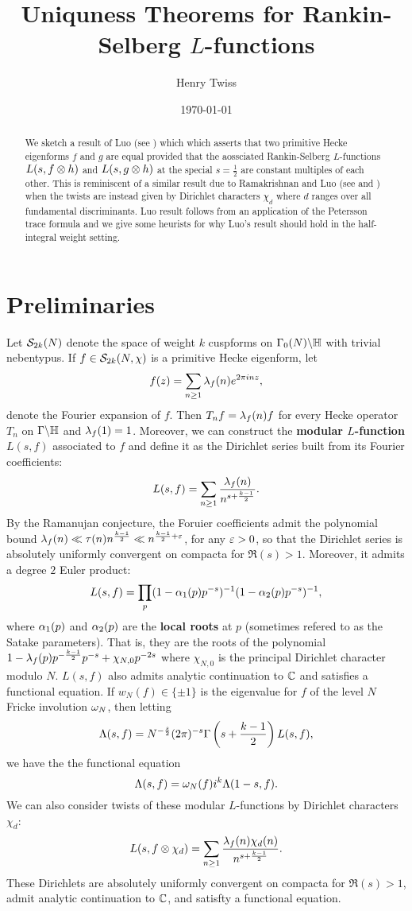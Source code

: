 \documentclass[12pt,reqno,oneside]{amsart}
\title{Uniquness Theorems for Rankin-Selberg \texorpdfstring{$L$}{L}-functions}
\author{Henry Twiss}
\date{\today}
\begin{document}
\begin{abstract}
    We sketch a result of Luo (see \cite{L}) which which asserts that two primitive Hecke eigenforms $f$ and $g$ are equal provided that the aossciated Rankin-Selberg $L$-functions $L(s,f \otimes h)$ and $L(s,g \otimes h)$ at the special $s = \frac{1}{2}$ are constant multiples of each other. This is reminiscent of a similar result due to Ramakrishnan and Luo (see \cite{LR-1} and \cite{LR-2}) when the twists are instead given by Dirichlet characters $\chi_{d}$ where $d$ ranges over all fundamental discriminants. Luo result follows from an application of the Petersson trace formula and we give some heurists for why Luo's result should hold in the half-integral weight setting.
\end{abstract}

\maketitle

\section{Preliminaries}
    Let $\mathcal{S}_{2k}(N)$ denote the space of weight $k$ cuspforms on $\Gamma_{0}(N)\backslash\mathbb{H}$ with trivial nebentypus. If $f \in \mathcal{S}_{2k}(N,\chi)$ is a primitive Hecke eigenform, let
    \[
        f(z) = \sum_{n \ge 1}\lambda_{f}(n)e^{2\pi inz},
    \]
    denote the Fourier expansion of $f$. Then $T_{n}f = \lambda_{f}(n)f$ for every Hecke operator $T_{n}$ on $\Gamma\backslash\mathbb{H}$ and $\lambda_{f}(1) = 1$. Moreover, we can construct the \textbf{modular $L$-function} $L(s,f)$ associated to $f$ and define it as the Dirichlet series built from its Fourier coefficients:
    \[
        L(s,f) = \sum_{n \ge 1}\frac{\lambda_{f}(n)}{n^{s+\frac{k-1}{2}}}.
    \]
    By the Ramanujan conjecture, the Foruier coefficients admit the polynomial bound $\lambda_{f}(n) \ll \tau(n)n^{\frac{k-1}{2}} \ll n^{\frac{k-1}{2}+\varepsilon}$, for any $\varepsilon > 0$, so that the Dirichlet series is absolutely uniformly convergent on compacta for $\Re(s) > 1$. Moreover, it admits a degree $2$ Euler product:
    \[
        L(s,f) = \prod_{p}(1-\alpha_{1}(p)p^{-s})^{-1}(1-\alpha_{2}(p)p^{-s})^{-1},
    \]
    where $\alpha_{1}(p)$ and $\alpha_{2}(p)$ are the \textbf{local roots} at $p$ (sometimes refered to as the Satake parameters). That is, they are the roots of the polynomial $1-\lambda_{f}(p)p^{-\frac{k-1}{2}}p^{-s}+\chi_{N,0}p^{-2s}$ where $\chi_{N,0}$ is the principal Dirichlet character modulo $N$. $L(s,f)$ also admits analytic continuation to $\mathbb{C}$ and satisfies a functional equation. If $w_{N}(f) \in \{\pm 1\}$ is the eigenvalue for $f$ of the level $N$ Fricke involution $\omega_{N}$, then letting
    \[
        \Lambda(s,f) = N^{-\frac{s}{2}}(2\pi)^{-s}\Gamma\left(s+\frac{k-1}{2}\right)L(s,f),
    \]
    we have the the functional equation
    \[
        \Lambda(s,f) = \omega_{N}(f)i^{k}\Lambda(1-s,f).
    \]
    We can also consider twists of these modular $L$-functions by Dirichlet characters $\chi_{d}$:
    \[
        L(s,f \otimes \chi_{d}) = \sum_{n \ge 1}\frac{\lambda_{f}(n)\chi_{d}(n)}{n^{s+\frac{k-1}{2}}}.
    \]
    These Dirichlets are absolutely uniformly convergent on compacta for $\Re(s) > 1$, admit analytic continuation to $\mathbb{C}$, and satisfty a functional equation.
\end{document}
